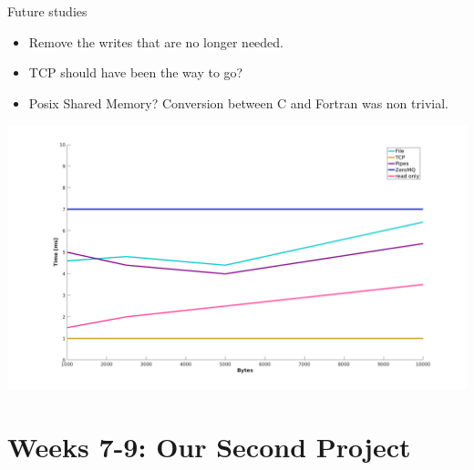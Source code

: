 \documentclass{beamer}
\begin{document}
    \begin{frame}{Future studies}
        \begin{itemize}[<+-|alert@+>]
            \item Remove the writes that are no longer needed.
            \item TCP should have been the way to go?
            \item Posix Shared Memory? Conversion between C and Fortran was non trivial.
        \end{itemize}
        \centering
        \includegraphics[width=1\columnwidth]{singlerun}
    \end{frame}


    \section{Weeks 7-9: Our Second Project}
\end{document}
